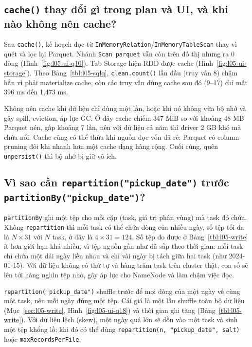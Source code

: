 \documentclass[
  12pt,
  a4paper,
]{report}
\begin{document}
\subsection{\texorpdfstring{\texttt{cache()} thay đổi gì trong plan và
UI, và khi nào không nên
cache?}{cache() thay đổi gì trong plan và UI, và khi nào không nên cache?}}\label{sec:l05-q7}

Sau \texttt{cache()}, kế hoạch đọc từ
\texttt{InMemoryRelation}\allowbreak{}/\texttt{InMemoryTableScan}\allowbreak{}
thay vì quét và lọc lại Parquet. Nhánh \texttt{Scan\ parquet} vẫn còn
trên đồ thị nhưng ra 0 dòng (Hình~\ref{fig:l05-ui-q10}). Tab Storage
hiện RDD được cache (Hình~\ref{fig:l05-ui-storage}). Theo
Bảng~\ref{tbl:l05-sqlq}, \texttt{clean.count()} lần đầu (truy vấn 8)
chậm hẳn vì phải materialize cache, còn các truy vấn dùng cache sau đó
(9--17) chỉ mất 396 ms đến 1,473 ms.

Không nên cache khi dữ liệu chỉ dùng một lần, hoặc khi nó không vừa bộ
nhớ và gây spill, eviction, áp lực GC. Ở đây cache chiếm 347 MiB so với
khoảng 48 MB Parquet nén, gấp khoảng 7 lần, nên với dữ liệu cả năm thì
driver 2 GB khó mà chứa nổi. Cache cũng có thể thừa khi nguồn đọc vốn đã
rẻ: Parquet có column pruning đôi khi nhanh hơn một cache dạng hàng
rộng. Cuối cùng, quên \texttt{unpersist()} thì bộ nhớ bị giữ vô ích.

\subsection{\texorpdfstring{Vì sao cần
\texttt{repartition("pickup\_}\allowbreak{}\texttt{date")}\allowbreak{}
trước
\texttt{partitionBy("pickup\_}\allowbreak{}\texttt{date")}\allowbreak{}?}{Vì sao cần repartition("pickup\_date") trước partitionBy("pickup\_date")?}}\label{sec:l05-q8}

\texttt{partitionBy} ghi một tệp cho mỗi cặp (task, giá trị phân vùng)
mà task đó chứa. Không \texttt{repartition} thì mỗi task có thể chứa
dòng của nhiều ngày, số tệp tối đa là \(N \times 31\) với \(N\) task, ở
đây là \(4 \times 31 = 124\). Số tệp đo được ở Bảng~\ref{tbl:l05-write}
ít hơn giới hạn khá nhiều, vì tệp nguồn gần như đã sắp theo thời gian:
mỗi task chỉ chứa một dải ngày liền nhau và chỉ vài ngày bị tách giữa
hai task (như 2024-01-15). Với dữ liệu không có thứ tự và hàng trăm task
trên cluster thật, con số sẽ lên tới hàng nghìn tệp nhỏ, gây áp lực cho
NameNode và làm chậm việc đọc.

\texttt{repartition("pickup\_}\allowbreak{}\texttt{date")}\allowbreak{}
shuffle trước để mọi dòng của một ngày về cùng một task, nên mỗi ngày
đúng một tệp. Cái giá là một lần shuffle toàn bộ dữ liệu
(Mục~\ref{sec:l05-write}, Hình~\ref{fig:l05-ui-q18}) và thời gian ghi
tăng (Bảng~\ref{tbl:l05-write}). Với dữ liệu lệch (skew), một ngày quá
lớn sẽ dồn vào một task và sinh một tệp khổng lồ; khi đó có thể dùng
\texttt{repartition(n,}\allowbreak{}\texttt{\ "pickup\_}\allowbreak{}\texttt{date",}\allowbreak{}\texttt{\ salt)}\allowbreak{}
hoặc \texttt{maxRecordsPerFile}\allowbreak{}.
\end{document}
